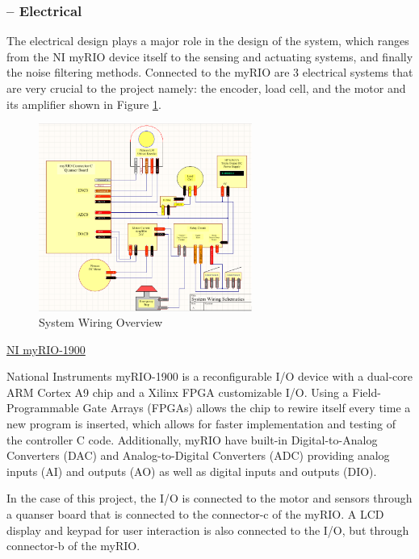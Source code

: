\subsubsection*{ -- Electrical}\par

The electrical design plays a major role in the design of the system, which ranges from the NI myRIO device itself to the sensing and actuating systems, and finally the noise filtering methods. Connected to the myRIO are 3 electrical systems that are very crucial to the project namely: the encoder, load cell, and the motor and its amplifier shown in Figure \ref{Wiring_Toon}.\par
\begin{figure}[htbp]
\begin{center}
\includegraphics[width=2.75in]{Images/Cartoon_Electrical.PNG}
\caption{System Wiring Overview}
\label{Wiring_Toon}
\end{center}
\end{figure}
\vspace{.167in}
\noindent\underline{NI myRIO-1900} \par
\vspace{.08in}
National Instruments myRIO-1900 is a reconfigurable I/O device with a dual-core ARM Cortex A9 chip and a Xilinx FPGA customizable I/O. Using a Field-Programmable Gate Arrays (FPGAs) allows the chip to rewire itself every time a new program is inserted, which allows for faster implementation and testing of the controller C code. Additionally, myRIO have built-in Digital-to-Analog Converters (DAC) and Analog-to-Digital Converters (ADC) providing analog inputs (AI) and outputs (AO) as well as digital inputs and outputs (DIO).\par In the case of this project, the I/O is connected to the motor and sensors through a quanser board that is connected to the connector-c of the myRIO. A LCD display and keypad for user interaction is also connected to the I/O, but through connector-b of the myRIO.\par
